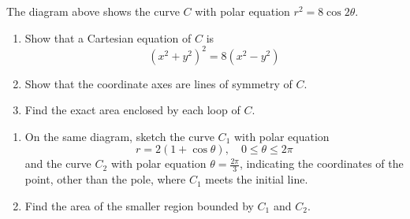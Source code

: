 \documentclass[leqno]{article}
\begin{document}
\begin{enumerate}[
  label=\textbf{\arabic*.},
  leftmargin=*,
  topsep=0pt,
  partopsep=0pt,
  parsep=0pt
]
\begin{figure}[H]
\end{figure}

\vspace*{10pt}


The diagram above shows the curve $C$ with polar equation $r^2=8\cos 2\theta$. \\

\begin{enumerate}[label=\textbf{(\alph*)}]
  \item Show that a Cartesian equation of $C$ is
  \[
  (x^2+y^2)^2=8(x^2-y^2)
  \]
  \item Show that the coordinate axes are lines of symmetry of $C$.  \\
  \item Find the exact area enclosed by each loop of $C$.  \\
\end{enumerate}
\newpage
\questionitem

\begin{enumerate}[label=\textbf{(\alph*)}]
  \item On the same diagram, sketch the curve $C_1$ with polar equation
  \[
  r=2(1+\cos\theta),\quad 0\leq\theta\leq2\pi
  \]
  and the curve $C_2$ with polar equation $\theta=\frac{2\pi}{3}$, indicating the coordinates of the point, other than the pole, where $C_1$ meets the initial line.  \\
  \item Find the area of the smaller region bounded by $C_1$ and $C_2$.  \\
\end{enumerate}

\newpage

\questionitem

\begin{figure}[H]
    \centering
{}
\end{figure}
\end{enumerate}
\end{document}
